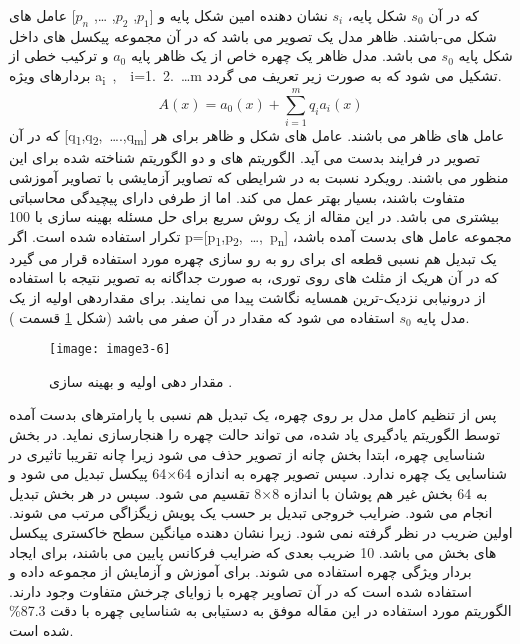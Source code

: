 که در آن $s_0$ شکل پایه، $s_i$ نشان دهنده  امین شکل پایه و [$p_1$, $p_2$, \ldots, $p_n$] عامل های شکل می-باشند. ظاهر  مدل  یک تصویر  می باشد که در آن  مجموعه پیکسل های داخل شکل پایه $s_0$ می باشد. مدل ظاهر یک چهره خاص از یک ظاهر پایه $a_0$ و ترکیب خطی از بردارهای ویژه
a\textsubscript{i}\ ,\ \ i=1.\ 2.\ \ldots m
تشکیل می شود که به صورت زیر تعریف می گردد.
\begin{equation}\label{eq3-2}
A(x)=a_0(x)+\sum_{i=1}^{m}{q_ia_i(x)}
\end{equation}
\noindent
که در آن
[q\textsubscript{1},q\textsubscript{2},\ \ldots.,q\textsubscript{m}]
عامل های ظاهر می باشند. عامل های شکل و ظاهر برای هر تصویر در فرایند  بدست می آید. الگوریتم های  و   دو الگوریتم شناخته شده برای این منظور می باشند. رویکرد  نسبت به  در شرایطی که تصاویر آزمایشی با تصاویر آموزشی متفاوت باشند، بسیار بهتر عمل می کند. اما از طرفی دارای پیچیدگی محاسباتی بیشتری می باشد. در این مقاله از یک روش  سریع برای حل مسئله بهینه سازی با 100 تکرار استفاده شده است. اگر
p=[p\textsubscript{1},p\textsubscript{2},\ \ldots,\ p\textsubscript{n}]
مجموعه عامل های بدست آمده باشد، یک تبدیل هم نسبی قطعه ای   برای رو به رو سازی چهره مورد استفاده قرار می گیرد که در آن هریک از مثلث های روی توری، به صورت جداگانه به تصویر نتیجه با استفاده از درونیابی نزدیک-ترین همسایه  نگاشت پیدا می نمایند. برای مقداردهی اولیه از یک مدل پایه $s_0$ استفاده می شود که مقدار  در آن صفر می باشد (شکل \ref{image3-6} قسمت ). 
 \begin{figure}[h]
\centering
  \texttt{[image: image3-6]}
  \caption{ مقدار دهی اولیه و بهینه سازی  \cite{ref1}.}
  \label{image3-6}
\end{figure}
\noindent
پس از تنظیم کامل مدل بر روی چهره، یک تبدیل هم نسبی با پارامترهای بدست آمده توسط الگوریتم یادگیری یاد شده، می تواند حالت چهره را هنجارسازی نماید. در بخش شناسایی چهره، ابتدا بخش چانه از تصویر حذف می شود زیرا چانه تقریبا تاثیری در شناسایی یک چهره ندارد. سپس تصویر چهره به اندازه 64×64 پیکسل تبدیل می شود و به 64 بخش غیر هم پوشان با اندازه 8×8 تقسیم می شود. سپس در هر بخش تبدیل   انجام می شود. ضرایب خروجی تبدیل  بر حسب یک پویش زیگزاگی مرتب می شوند. اولین ضریب در نظر گرفته نمی شود. زیرا نشان دهنده میانگین سطح خاکستری پیکسل های بخش می باشد. 10 ضریب بعدی که ضرایب فرکانس پایین می باشند، برای ایجاد بردار ویژگی چهره استفاده می شوند. برای آموزش و آزمایش از مجموعه داده  و  استفاده شده است که در آن تصاویر چهره با زوایای چرخش متفاوت وجود دارند. الگوریتم مورد استفاده در این مقاله موفق به دستیابی به شناسایی چهره با دقت 87.3\% شده است.
